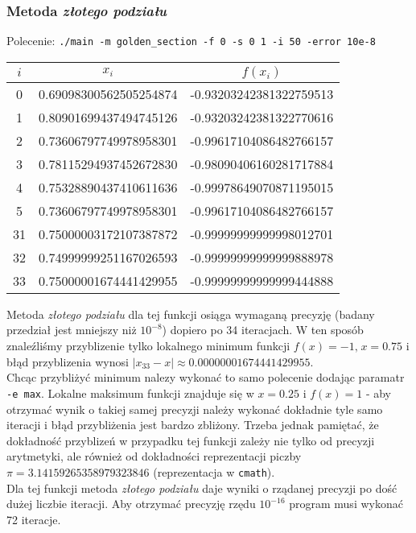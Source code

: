 \documentclass[a4paper,11pt]{article}
\begin{document}
      \subsubsection{Metoda \emph{złotego podziału}}
      Polecenie: \texttt{./main -m golden\_section -f 0 -s 0 1 -i 50 -error 10e-8} \\
      \begin{center}
      \begin{tabular}{S[table-format=1.0]S[table-format=-1.9]S[table-format=-1.15,table-auto-round=false]}
        \toprule
        {$i$}                & {$x_i$}               & {$f(x_i)$}            \\  & 0.69098300562505254874 & -0.93203242381322759513 \\
          1 & 0.80901699437494745126 & -0.93203242381322770616 \\
          2 & 0.73606797749978958301 & -0.99617104086482766157 \\
          3 & 0.78115294937452672830 & -0.98090406160281717884 \\
          4 & 0.75328890437410611636 & -0.99978649070871195015 \\
          5 & 0.73606797749978958301 & -0.99617104086482766157 \\
          31 & 0.75000003172107387872 & -0.99999999999998012701 \\
          32 & 0.74999999251167026593 & -0.99999999999999888978 \\
          33 & 0.75000001674441429955 & -0.99999999999999444888 \\ \bottomrule
        \end{tabular}
    \end{center}
    
    Metoda \emph{złotego podziału} dla tej funkcji osiąga wymaganą precyzję (badany przedział jest mniejszy niż $10^{-8}$) dopiero po 34 iteracjach. W ten sposób znaleźliśmy przyblizenie tylko lokalnego minimum funkcji $ f(x) = -1\textrm{,}\; x = 0.75 $ i błąd przyblizenia wynosi $ |x_{33} - x| \approx 0.00000001674441429955 $. \\
    Chcąc przybliżyć minimum nalezy wykonać to samo polecenie dodając paramatr \texttt{-e max}. Lokalne maksimum funkcji znajduje się w $ x = 0.25 $ i $ f(x) = 1 $ - aby otrzymać wynik o takiej samej precyzji należy wykonać dokładnie tyle samo iteracji i błąd przybliżenia jest bardzo zbliżony. Trzeba jednak pamiętać, że dokładność przyblizeń w przypadku tej funkcji zależy nie tylko od precyzji arytmetyki, ale również od dokładności reprezentacji piczby $\pi = 3.14159265358979323846$ (reprezentacja w \texttt{cmath}). \\
    Dla tej funkcji metoda \emph{złotego podziału} daje wyniki o rządanej precyzji po dość dużej liczbie iteracji. Aby otrzymać precyzję rzędu $10^{-16}$ program musi wykonać 72 iteracje.
\end{document}
